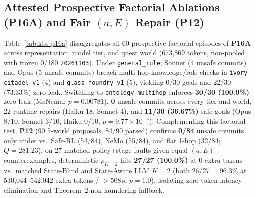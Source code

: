 \subsection{Attested Prospective Factorial Ablations (\textbf{P16A}) and Fair $(a,E)$ Repair (\textbf{P12})}
Table~\ref{tab:kbs-p16a} disaggregates all 60 prospective factorial episodes of \textbf{P16A} across representation, model tier, and quest world (673,869 tokens, non-pooled with frozen 0/180 \texttt{20261103}). Under \texttt{general\_rule}, Sonnet (4 unsafe commits) and Opus (5 unsafe commits) breach multi-hop knowledge/role checks in \texttt{ivory-citadel-v1} (4) and \texttt{glass-foundry-v1} (5), yielding 0/30 goals and 22/30 (73.33\%) zero-leak. Switching to \texttt{ontology\_multihop} enforces \textbf{30/30 (100.0\%)} zero-leak (McNemar $p{=}0.00781$), \textbf{0} unsafe commits across every tier and world, 22 runtime repairs (Haiku 18, Sonnet 4), and \textbf{11/30 (36.67\%)} safe goals (Opus 8/10, Sonnet 3/10, Haiku 0/10; $p{=}9.77{\times}10^{-4}$). Complementing this factorial test, \textbf{P12} (90 5-world proposals, 84/90 parsed) confirms \textbf{0/84} unsafe commits only under \system{} vs.\ Safe-RL (54/84), NeMo (55/84), and flat 1-hop (32/84; $Q{=}281.23$); on 27 matched policy+stage faults given equal $(a,E)$ counterexamples, deterministic $\rho_{K=2}$ hits \textbf{27/27 (100.0\%)} at 0 extra tokens vs.\ matched State-Blind and State-Aware LLM $K{=}2$ (both 26/27 = 96.3\% at 530,044--542,042 extra tokens / $>$508\,s, $p{=}1.0$), isolating zero-token latency elimination and Theorem~2 non-laundering fallback.


